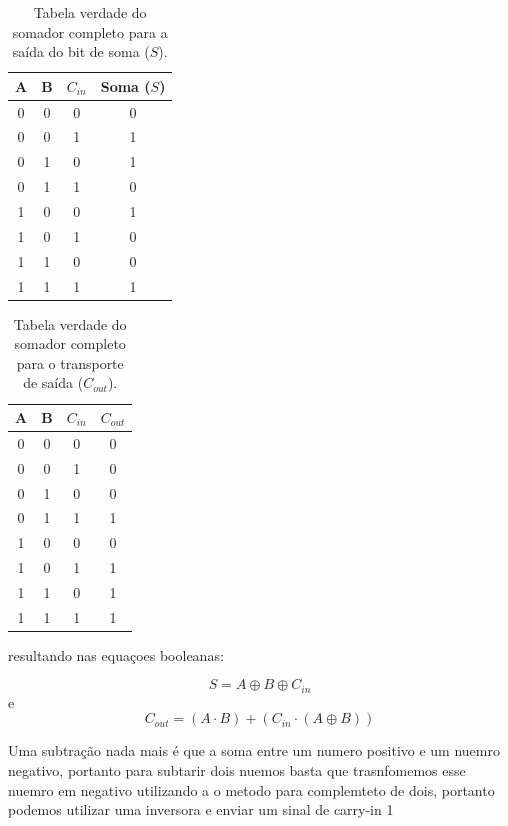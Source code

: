 \begin{table}[htb]
\centering
\caption{Tabela verdade do somador completo para a saída do bit de soma ($S$).}
\label{tab:fa_soma}
\begin{tabular}{cccc}
\toprule
\textbf{A} & \textbf{B} & \textbf{$C_{in}$} & \textbf{Soma ($S$)} \\
\midrule
0 & 0 & 0 & 0 \\
0 & 0 & 1 & 1 \\
0 & 1 & 0 & 1 \\
0 & 1 & 1 & 0 \\
1 & 0 & 0 & 1 \\
1 & 0 & 1 & 0 \\
1 & 1 & 0 & 0 \\
1 & 1 & 1 & 1 \\
\bottomrule
\end{tabular}
\end{table}

\begin{table}[htb]
\centering
\caption{Tabela verdade do somador completo para o transporte de saída ($C_{out}$).}
\label{tab:fa_cout}
\begin{tabular}{cccc}
\toprule
\textbf{A} & \textbf{B} & \textbf{$C_{in}$} & \textbf{$C_{out}$} \\
\midrule
0 & 0 & 0 & 0 \\
0 & 0 & 1 & 0 \\
0 & 1 & 0 & 0 \\
0 & 1 & 1 & 1 \\
1 & 0 & 0 & 0 \\
1 & 0 & 1 & 1 \\
1 & 1 & 0 & 1 \\
1 & 1 & 1 & 1 \\
\bottomrule
\end{tabular}
\end{table}

resultando nas equaçoes booleanas:

$$S = A \oplus B \oplus C_{in}$$
e
$$C_{out} = (A \cdot B) + (C_{in} \cdot (A \oplus B))$$

Uma subtração nada mais é que a soma entre um numero positivo e um nuemro negativo, portanto para subtarir dois nuemos basta que trasnfomemos esse nuemro em negativo utilizando a o metodo para complemteto de dois, portanto podemos utilizar uma inversora e enviar um sinal de carry-in 1

